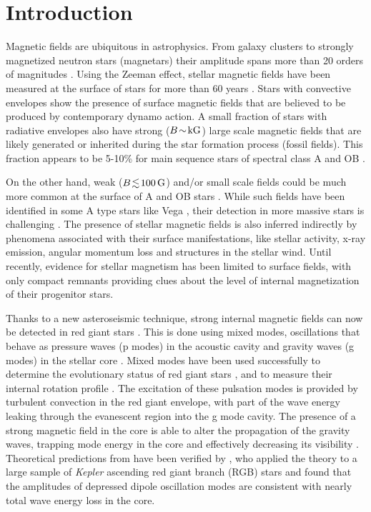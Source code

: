 \section{Introduction}
\label{intro}
Magnetic fields are ubiquitous in astrophysics. From  galaxy clusters to strongly magnetized neutron stars (magnetars) their amplitude spans more than 20 orders of magnitudes \citep{Brandenburg_2005}. Using the Zeeman effect, stellar magnetic fields have been measured at the surface of stars
for more than 60 years \citep{Babcock_1947,Landstreet_1992,Donati_2009}. Stars with convective envelopes show the presence of surface magnetic fields that are believed to be produced by contemporary dynamo action. A small fraction of stars with radiative envelopes also have strong ($B \! \sim \! {\rm kG}$) large scale magnetic fields that are likely generated or inherited during the star formation process (fossil fields). This fraction appears to be 5-10\% for main sequence stars of spectral class A \citep[e.g.,][]{Auriere2004} and OB \citep{2012ASPC..464..405W}.

On the other hand, weak ($B \! \lesssim \! 100 \, {\rm G}$) and/or small scale fields could be much more common at the surface of A and OB stars \citep{Cantiello_2011,Braithwaite_2012}. While such fields have been identified in some A type stars like Vega \citep{Lignieres2009}, their detection in more massive stars is challenging \citep{2013A&A...554A..93K}. The presence of stellar magnetic fields is also inferred indirectly by phenomena associated with their surface manifestations, like stellar activity, x-ray emission, angular momentum loss and structures in the stellar wind. Until recently, evidence for stellar magnetism has been limited to surface fields, with only compact remnants providing clues about the level of internal magnetization of their progenitor stars.

Thanks to a new asteroseismic technique, strong internal magnetic fields can now be detected in red giant stars \citep{Fuller_2015}. This is done using mixed modes, oscillations that behave as pressure waves (p modes) in the acoustic cavity and gravity waves (g modes) in the stellar core \cite{Dupret_2009}. Mixed modes have been used successfully to determine the evolutionary status of red giant stars \citep{Bedding_2011}, and to measure their internal rotation profile \citep{Beck_2011}.  The excitation of these pulsation modes is provided by turbulent convection in the red giant envelope, with part of the wave energy leaking through the evanescent region into the g mode cavity. The presence of a strong magnetic field in the core is able to alter the propagation of the gravity waves, trapping  mode energy in the core and effectively decreasing its visibility \citep[magnetic greenhouse effect,]{Fuller_2015}. Theoretical predictions from \citet{Fuller_2015} have been verified by \citet{Stello_2016}, who applied the theory to a large sample of {\it Kepler} ascending red giant branch (RGB) stars and found that the amplitudes of depressed dipole oscillation modes are consistent with nearly total wave energy loss in the core.

